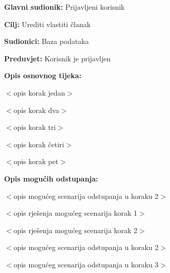 \noindent {}
\begin{packed_item}

\item \textbf{Glavni sudionik:} Prijavljeni korisnik
\item  \textbf{Cilj:} Urediti vlastiti članak
\item  \textbf{Sudionici:} Baza podataka
\item  \textbf{Preduvjet:} Korisnik je prijavljen
\item  \textbf{Opis osnovnog tijeka:}

\item[] \begin{packed_enum}

    \item $<$opis korak jedan$>$
    \item $<$opis korak dva$>$
    \item $<$opis korak tri$>$
    \item $<$opis korak četiri$>$
    \item $<$opis korak pet$>$

\end{packed_enum}

\item  \textbf{Opis mogućih odstupanja:}

\item[] \begin{packed_item}

    \item[2.a] $<$opis mogućeg scenarija odstupanja u koraku 2$>$

    \item[] \begin{packed_enum}

        \item $<$opis rješenja mogućeg scenarija korak 1$>$
        \item $<$opis rješenja mogućeg scenarija korak 2$>$

    \end{packed_enum}

\item[2.b] $<$opis mogućeg scenarija odstupanja u koraku 2$>$
\item[3.a] $<$opis mogućeg scenarija odstupanja  u koraku 3$>$

\end{packed_item}

\end{packed_item}

